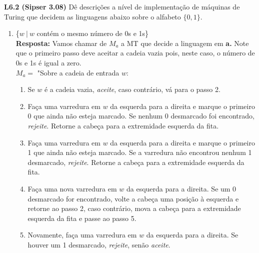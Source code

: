 
\noindent \textbf{L6.2 (Sipser 3.08)} Dê descrições a nível de implementação de máquinas de Turing que decidem as linguagens abaixo sobre o alfabeto $\{0, 1\}$.
\begin{enumerate}[label={\textbf{\alph*.}}]
\item \{$w\ |\ w$ contém o mesmo número de 0s e 1s\}\\[3pt]
\textbf{Resposta: } Vamos chamar de $M_a$ a MT que decide a linguagem em \textbf{a.} Note que o primeiro passo deve aceitar a cadeia vazia pois, neste caso, o número de 0s e 1s é igual a zero.\\[3pt]
$M_a = $ "Sobre a cadeia de entrada $w$:
\begin{enumerate}[label={\textbf{\arabic*.}}, leftmargin=1in]
\item Se $w$ é a cadeia vazia, \textit{aceite}, caso contrário, vá para o passo 2.
\item Faça uma varredura em $w$ da esquerda para a direita e marque o primeiro 0 que ainda não esteja marcado. Se nenhum 0 desmarcado foi encontrado, \textit{rejeite}. Retorne a cabeça para a extremidade esquerda da fita.
\item Faça uma varredura em $w$ da esquerda para a direita e marque o primeiro 1 que ainda não esteja marcado. Se a varredura não encontrou nenhum 1 desmarcado, \textit{rejeite}. Retorne a cabeça para a extremidade esquerda da fita.
\item Faça uma nova varredura em $w$ da esquerda para a direita. Se um 0 desmarcado for encontrado, volte a cabeça uma posição à esquerda e retorne ao passo 2, caso contrário, mova a cabeça para a extremidade esquerda da fita e passe ao passo 5.
\item Novamente, faça uma varredura em $w$ da esquerda para a direita. Se houver um 1 desmarcado, \textit{rejeite}, senão \textit{aceite}.
\end{enumerate}


\end{enumerate}
